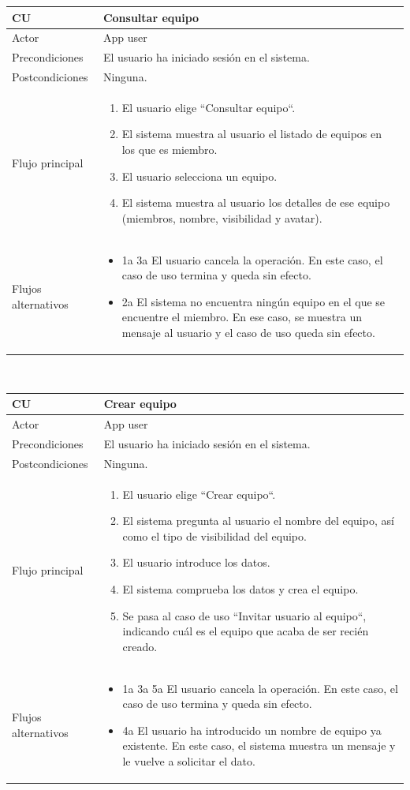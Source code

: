 \documentclass[twoside]{report}
\newcommand\addrow[2]{#1 &#2\\ }
\newcommand\addheading[2]{#1 &#2\\ \hline}
\newcommand\tabularhead{\begin{tabular}{lp{0.7\textwidth}}
\hline
}
\newenvironment{usecase}{\tabularhead}
{\hline\end{tabular}}
\begin{document}
\begin{usecase}
  \addheading{\textbf{CU\arabic{usecase}}}{Consultar equipo} 
  \addrow{Actor}{App user}
  \addrow{Precondiciones}{El usuario ha iniciado sesión en el sistema.}
  \addrow{Postcondiciones}{Ninguna.}
  \addrow{Flujo principal}{
  		\begin{enumerate}
  		\item El usuario elige “Consultar equipo“. %
  		\item El sistema muestra al usuario el listado de equipos en los que es miembro. %
  		\item El usuario selecciona un equipo. %
  		\item El sistema muestra al usuario los detalles de ese equipo (miembros, nombre, visibilidad y avatar). %
  		\end{enumerate}
  }
  \addrow{Flujos alternativos}{
  		\begin{itemize}
  		\item 1a 3a El usuario cancela la operación. En este caso, el caso de uso termina y queda sin efecto.
  		\item 2a El sistema no encuentra ningún equipo en el que se encuentre el miembro. En ese caso, se muestra un mensaje al usuario y el caso de uso queda sin efecto.
  		\end{itemize}
  }
\end{usecase}\\

\begin{usecase}
  \addheading{\textbf{CU\arabic{usecase}}}{Crear equipo} 
  \addrow{Actor}{App user}
  \addrow{Precondiciones}{El usuario ha iniciado sesión en el sistema.}
  \addrow{Postcondiciones}{Ninguna.}
  \addrow{Flujo principal}{
  		\begin{enumerate}
  		\item El usuario elige “Crear equipo“. %
  		\item El sistema pregunta al usuario el nombre del equipo, así como el tipo de visibilidad del equipo. %
  		\item El usuario introduce los datos. %
  		\item El sistema comprueba los datos y crea el equipo. %
  		\item Se pasa al caso de uso “Invitar usuario al equipo“, indicando cuál es el equipo que acaba de ser recién creado.
  		\end{enumerate}
  }
  \addrow{Flujos alternativos}{
  		\begin{itemize}
  		\item 1a 3a 5a El usuario cancela la operación. En este caso, el caso de uso termina y queda sin efecto.
  		\item 4a El usuario ha introducido un nombre de equipo ya existente. En este caso, el sistema muestra un mensaje y le vuelve a solicitar el dato.
  		\end{itemize}
  }
\end{usecase}\\
\end{document}
